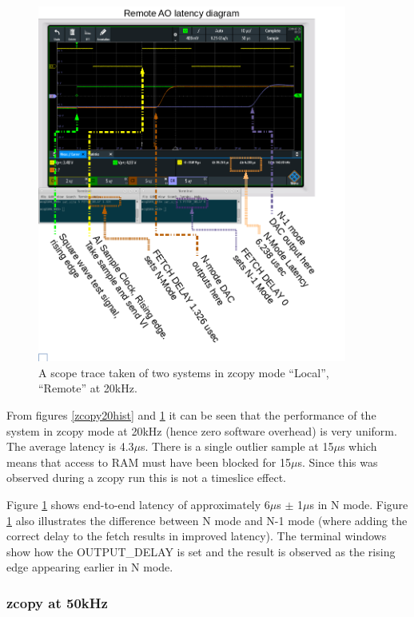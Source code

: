 \documentclass{article}
\begin{document}
\begin{figure} [htb!]
	\centering
	\includegraphics[width=4.0in]{images/20kHz_annotated_scope.png}
	\caption{A scope trace taken of two systems in zcopy mode “Local”, “Remote” at 20kHz.}
	\label{zcopy20scope}
\end{figure}

From figures \ref{zcopy20hist} and \ref{zcopy20scope} it can be seen that the performance of the system in zcopy mode at 20kHz (hence zero software overhead) is very uniform.
The average latency is 4.3$\mu$s.
There is a single outlier sample at 15$\mu$s which means that access to RAM must have been blocked for 15$\mu$s.
Since this was observed during a zcopy run this is not a timeslice effect.

Figure \ref{zcopy20scope} shows end-to-end latency of approximately 6$\mu$s $\pm$ 1$\mu$s in N mode.
Figure \ref{zcopy20scope} also illustrates the difference between N mode and N-1 mode (where adding the correct delay to the fetch results in improved latency).
The terminal windows show how the OUTPUT\_DELAY is set and the result is observed as the rising edge appearing earlier in N mode.

\subsubsection{zcopy at 50kHz}
\end{document}

